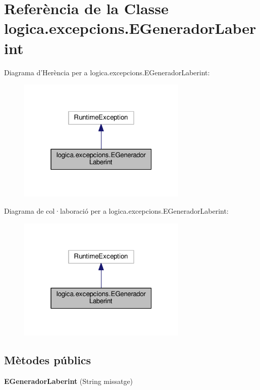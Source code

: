 \hypertarget{classlogica_1_1excepcions_1_1_e_generador_laberint}{\section{Referència de la Classe logica.\+excepcions.\+E\+Generador\+Laberint}
\label{classlogica_1_1excepcions_1_1_e_generador_laberint}
}


Diagrama d'Herència per a logica.\+excepcions.\+E\+Generador\+Laberint\+:\nopagebreak
\begin{figure}[H]
\begin{center}
\leavevmode
\includegraphics[width=229pt]{classlogica_1_1excepcions_1_1_e_generador_laberint__inherit__graph}
\end{center}
\end{figure}


Diagrama de col·laboració per a logica.\+excepcions.\+E\+Generador\+Laberint\+:\nopagebreak
\begin{figure}[H]
\begin{center}
\leavevmode
\includegraphics[width=229pt]{classlogica_1_1excepcions_1_1_e_generador_laberint__coll__graph}
\end{center}
\end{figure}
\subsection*{Mètodes públics}
\begin{DoxyCompactItemize}
\item 
\hypertarget{classlogica_1_1excepcions_1_1_e_generador_laberint_a011bff23b73bf1d2fae65bdf3216a4c0}{{\bfseries E\+Generador\+Laberint} (String missatge)}\label{classlogica_1_1excepcions_1_1_e_generador_laberint_a011bff23b73bf1d2fae65bdf3216a4c0}

\end{DoxyCompactItemize}


